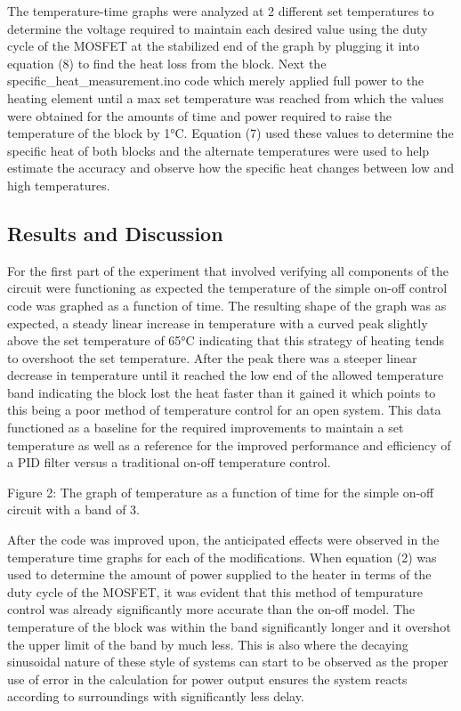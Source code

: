 \documentclass[11pt]{article}
\begin{document}
    The temperature-time graphs were analyzed at 2 different set
temperatures to determine the voltage required to maintain each desired
value using the duty cycle of the MOSFET at the stabilized end of the
graph by plugging it into equation (8) to find the heat loss from the
block. Next the specific\_heat\_measurement.ino code which merely
applied full power to the heating element until a max set temperature
was reached from which the values were obtained for the amounts of time
and power required to raise the temperature of the block by 1°C.
Equation (7) used these values to determine the specific heat of both
blocks and the alternate temperatures were used to help estimate the
accuracy and observe how the specific heat changes between low and high
temperatures.

    \hypertarget{results-and-discussion}{%
\subsection{Results and Discussion}\label{results-and-discussion}}

    For the first part of the experiment that involved verifying all
components of the circuit were functioning as expected the temperature
of the simple on-off control code was graphed as a function of time. The
resulting shape of the graph was as expected, a steady linear increase
in temperature with a curved peak slightly above the set temperature of
65°C indicating that this strategy of heating tends to overshoot the set
temperature. After the peak there was a steeper linear decrease in
temperature until it reached the low end of the allowed temperature band
indicating the block lost the heat faster than it gained it which points
to this being a poor method of temperature control for an open system.
This data functioned as a baseline for the required improvements to
maintain a set temperature as well as a reference for the improved
performance and efficiency of a PID filter versus a traditional on-off
temperature control.

    Figure 2: The graph of temperature as a function of time for the simple
on-off circuit with a band of 3.

    After the code was improved upon, the anticipated effects were observed
in the temperature time graphs for each of the modifications. When
equation (2) was used to determine the amount of power supplied to the
heater in terms of the duty cycle of the MOSFET, it was evident that
this method of tempurature control was already significantly more
accurate than the on-off model. The temperature of the block was within
the band significantly longer and it overshot the upper limit of the
band by much less. This is also where the decaying sinusoidal nature of
these style of systems can start to be observed as the proper use of
error in the calculation for power output ensures the system reacts
according to surroundings with significantly less delay.
\end{document}
